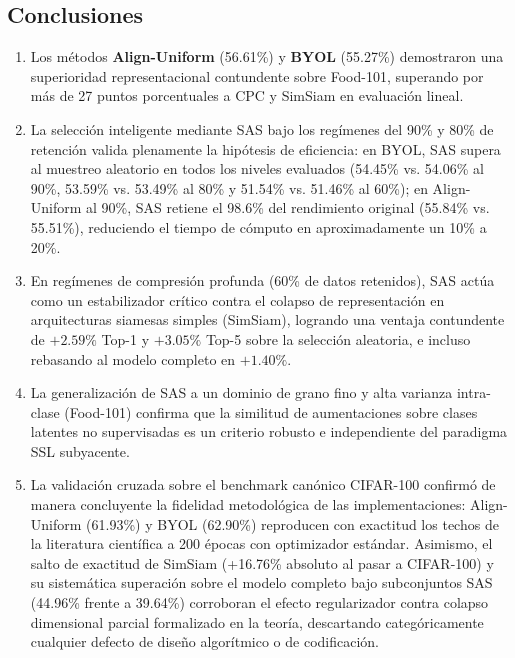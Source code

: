\subsection{Conclusiones}
\begin{enumerate}
    \item Los métodos \textbf{Align-Uniform} (56.61\%) y \textbf{BYOL} (55.27\%) demostraron una superioridad representacional contundente sobre Food-101, superando por más de 27 puntos porcentuales a CPC y SimSiam en evaluación lineal.
    \item La selección inteligente mediante SAS bajo los regímenes del 90\% y 80\% de retención valida plenamente la hipótesis de eficiencia: en BYOL, SAS supera al muestreo aleatorio en todos los niveles evaluados (54.45\% vs. 54.06\% al 90\%, 53.59\% vs. 53.49\% al 80\% y 51.54\% vs. 51.46\% al 60\%); en Align-Uniform al 90\%, SAS retiene el 98.6\% del rendimiento original (55.84\% vs. 55.51\%), reduciendo el tiempo de cómputo en aproximadamente un 10\% a 20\%.
    \item En regímenes de compresión profunda (60\% de datos retenidos), SAS actúa como un estabilizador crítico contra el colapso de representación en arquitecturas siamesas simples (SimSiam), logrando una ventaja contundente de $+2.59\%$ Top-1 y $+3.05\%$ Top-5 sobre la selección aleatoria, e incluso rebasando al modelo completo en $+1.40\%$.
    \item La generalización de SAS a un dominio de grano fino y alta varianza intra-clase (Food-101) confirma que la similitud de aumentaciones sobre clases latentes no supervisadas es un criterio robusto e independiente del paradigma SSL subyacente.
    \item La validación cruzada sobre el benchmark canónico CIFAR-100 confirmó de manera concluyente la fidelidad metodológica de las implementaciones: Align-Uniform (61.93\%) y BYOL (62.90\%) reproducen con exactitud los techos de la literatura científica a 200 épocas con optimizador estándar. Asimismo, el salto de exactitud de SimSiam (+16.76\% absoluto al pasar a CIFAR-100) y su sistemática superación sobre el modelo completo bajo subconjuntos SAS (44.96\% frente a 39.64\%) corroboran el efecto regularizador contra colapso dimensional parcial formalizado en la teoría, descartando categóricamente cualquier defecto de diseño algorítmico o de codificación.
\end{enumerate}
